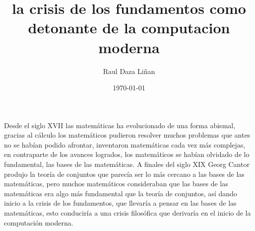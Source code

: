 \documentclass[letterpaper, 12pt]{article}
\title{la crisis de los fundamentos como detonante de la computacion moderna}
\author{Raul Daza Liñan}
\date{\today}
\begin{document}
\maketitle

Desde el siglo XVII las matemáticas ha evolucionado de una forma abismal, gracias al cálculo los matemáticos pudieron resolver muchos problemas que antes no se habían podido afrontar, inventaron matemáticas cada vez más complejas, en contraparte de los avances logrados, los matemáticos se habían olvidado de lo fundamental, las bases de las matemáticas. A finales del siglo XIX Georg Cantor produjo la teoría de conjuntos que parecía ser lo más cercano a las bases de las matemáticas, pero muchos matemáticos consideraban que las bases de las matemáticas era algo más fundamental que la teoría de conjuntos, así dando inicio a la crisis de los fundamentos, que llevaría a pensar en las bases de las matemáticas, esto conduciría a una crisis filosófica que derivaría en el inicio de la computación moderna.
\end{document}
